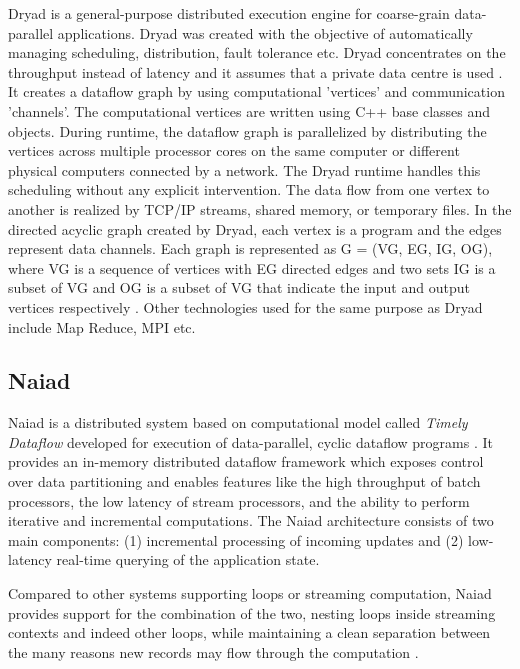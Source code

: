     Dryad is a general-purpose distributed execution engine for
    coarse-grain data-parallel applications. Dryad was created with
    the objective of
    automatically managing scheduling, distribution, fault tolerance
    etc. Dryad concentrates on the throughput instead of latency and
    it assumes that a private data centre is used \cite{www-DryadIntro}.
    It creates a dataflow graph by using computational 'vertices' and communication
    'channels'. The computational vertices are written using C++ base
    classes and objects. During runtime, the dataflow graph is
    parallelized by distributing the vertices across multiple
    processor cores on the same computer or different physical
    computers connected by a network. The Dryad runtime handles this
    scheduling without any explicit intervention. The data flow from
    one vertex to another is realized by TCP/IP streams, shared
    memory, or temporary files. In the directed acyclic graph created
    by Dryad, each vertex is a program and the edges represent data
    channels. Each graph is represented as G = (VG, EG, IG, OG),
    where VG is a sequence of vertices with EG
    directed edges and two sets IG is a subset of VG and OG is a
    subset of VG that indicate the input and output vertices
    respectively \cite{DryadPaper}. Other technologies used for the
    same purpose as Dryad include Map Reduce, MPI etc.

    \pv

    
\subsection{Naiad \vc}

    Naiad is a distributed system based on
    computational model called \textit{Timely Dataflow} developed for
    execution of data-parallel, cyclic dataflow programs \cite{paper-naiad}.
    It provides
    an in-memory distributed dataflow framework which exposes control
    over data partitioning and enables features like the high
    throughput of batch processors, the low latency of stream
    processors, and the ability to perform iterative and incremental
    computations. The Naiad architecture consists of two main
    components: (1) incremental processing of incoming updates and (2)
    low-latency real-time querying of the application state.
    
    Compared to other systems supporting loops or streaming
    computation, Naiad provides support for the combination of the
    two, nesting loops inside streaming contexts and indeed other
    loops, while maintaining a clean separation between the many
    reasons new records may flow through the computation
    \cite{www-naiad}.
    
